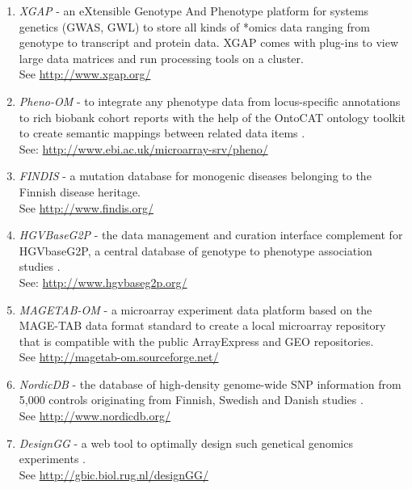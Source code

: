 \begin{enumerate}\itemsep1pt
\item \emph{XGAP} - an eXtensible Genotype And Phenotype platform \cite{Swertz:2010a} for systems genetics 
(GWAS, GWL) to store all kinds of *omics data ranging from genotype to transcript and protein 
data. XGAP comes with plug-ins to view large data matrices and run processing tools on a cluster.\\
See \url{http://www.xgap.org/}
\item \emph{Pheno-OM} - to integrate any phenotype data from locus-specific annotations to 
rich biobank cohort reports with the help of the OntoCAT ontology toolkit to create semantic 
mappings between related data items \cite{Kurbatova:2011}.\\
See: \url{http://www.ebi.ac.uk/microarray-srv/pheno/}
\item \emph{FINDIS} - a mutation database for monogenic diseases belonging to the Finnish 
disease heritage.\\ See \url{http://www.findis.org/}
\item \emph{HGVBaseG2P} - the data management and curation interface complement for HGVbaseG2P, 
a central database of genotype to phenotype association studies \cite{Fredman:2002}.\\See: \url{http://www.hgvbaseg2p.org/}
\item \emph{MAGETAB-OM} - a microarray experiment data platform based on the MAGE-TAB data format 
standard to create a local microarray repository that is compatible with the public ArrayExpress 
and GEO repositories.\\ See \url{http://magetab-om.sourceforge.net/} 
\item \emph{NordicDB} - the database of high-density genome-wide SNP information from 5,000 
controls originating from Finnish, Swedish and Danish studies \cite{Leu:2010}.\\ See \url{http://www.nordicdb.org/}
\item \emph{DesignGG} - a web tool to optimally design such genetical genomics experiments \cite{Li:2009}.\\
See \url{http://gbic.biol.rug.nl/designGG/}
\end{enumerate}

